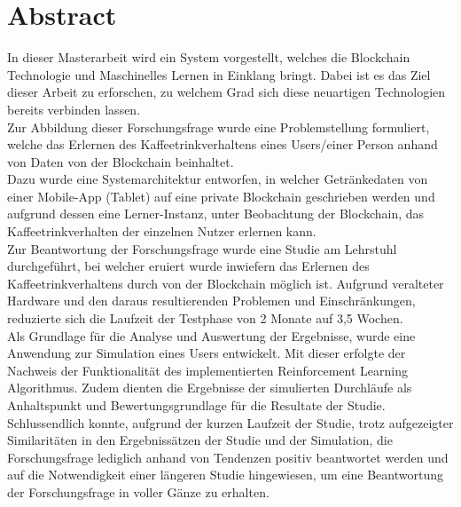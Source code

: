 \chapter{Abstract}
In dieser Masterarbeit wird ein System vorgestellt, welches die Blockchain Technologie und Maschinelles Lernen in Einklang bringt. Dabei ist es das Ziel dieser Arbeit zu erforschen, zu welchem Grad sich diese neuartigen Technologien bereits verbinden lassen. \\
Zur Abbildung dieser Forschungsfrage wurde eine Problemstellung formuliert, welche das Erlernen des Kaffeetrinkverhaltens eines Users/einer Person anhand von Daten von der Blockchain beinhaltet.\\
Dazu wurde eine Systemarchitektur entworfen, in welcher Getränkedaten von einer Mobile-App (Tablet) auf eine private Blockchain geschrieben werden und aufgrund dessen eine Lerner-Instanz, unter Beobachtung der Blockchain, das Kaffeetrinkverhalten der einzelnen Nutzer erlernen kann.\\
Zur Beantwortung der Forschungsfrage wurde eine Studie am Lehrstuhl durchgeführt, bei welcher eruiert wurde inwiefern das Erlernen des Kaffeetrinkverhaltens durch von der Blockchain möglich ist. Aufgrund veralteter Hardware und den daraus resultierenden Problemen und Einschränkungen, reduzierte sich die Laufzeit der Testphase von 2 Monate auf 3,5 Wochen.\\
Als Grundlage für die Analyse und Auswertung der Ergebnisse, wurde eine Anwendung zur Simulation eines Users entwickelt. Mit dieser erfolgte der Nachweis der Funktionalität des implementierten Reinforcement Learning Algorithmus. Zudem dienten die Ergebnisse der simulierten Durchläufe als Anhaltspunkt und Bewertungsgrundlage für die Resultate der Studie. \\
Schlussendlich konnte, aufgrund der kurzen Laufzeit der Studie, trotz aufgezeigter Similaritäten in den Ergebnissätzen der Studie und der Simulation, die Forschungsfrage lediglich anhand von Tendenzen positiv beantwortet werden und auf die Notwendigkeit einer längeren Studie hingewiesen, um eine Beantwortung der Forschungsfrage in voller Gänze zu erhalten.
